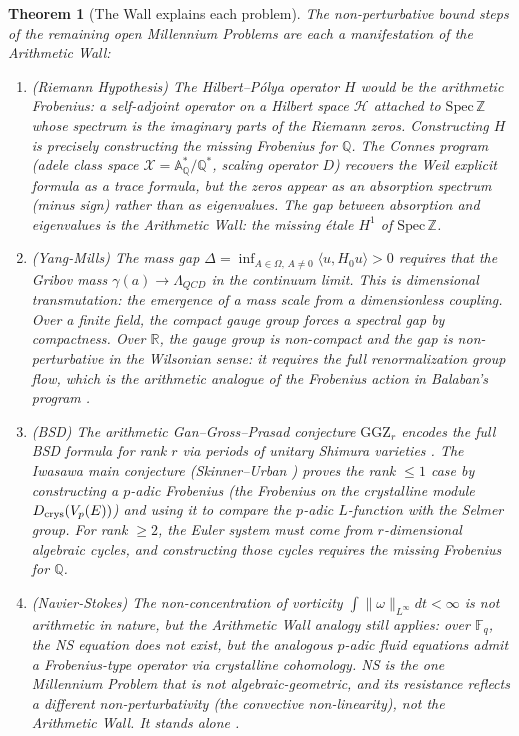 \documentclass[12pt]{article}
\newtheorem{theorem}{Theorem}
\theoremstyle{definition}
\theoremstyle{remark}
\begin{document}
\begin{theorem}[The Wall explains each problem]\label{thm:wall}
The non-perturbative bound steps of the remaining open Millennium Problems
are each a manifestation of the Arithmetic Wall:
\begin{enumerate}
\item \textup{(Riemann Hypothesis)} The Hilbert--Pólya operator $H$ would be
  the arithmetic Frobenius: a self-adjoint operator on a Hilbert space
  $\mathcal{H}$ attached to $\mathrm{Spec}\,\mathbb{Z}$ whose spectrum is the
  imaginary parts of the Riemann zeros. Constructing $H$ is precisely
  constructing the missing Frobenius for $\mathbb{Q}$.
  The Connes program \cite{connes} (adele class space $\mathcal{X} = \mathbb{A}^*_\mathbb{Q}/\mathbb{Q}^*$,
  scaling operator $D$) recovers the Weil explicit formula as a trace
  formula, but the zeros appear as an \emph{absorption spectrum}
  (minus sign) rather than as eigenvalues. The gap between absorption
  and eigenvalues is the Arithmetic Wall: the missing étale $H^1$ of
  $\mathrm{Spec}\,\mathbb{Z}$.

\item \textup{(Yang-Mills)} The mass gap
  $\Delta = \inf_{A\in\Omega,\, A\neq 0}\langle u, H_0 u\rangle > 0$
  requires that the Gribov mass $\gamma(a)\to\Lambda_{QCD}$ in the
  continuum limit. This is dimensional transmutation: the emergence of
  a mass scale from a dimensionless coupling. Over a finite field,
  the compact gauge group forces a spectral gap by compactness.
  Over $\mathbb{R}$, the gauge group is non-compact and the gap is
  non-perturbative in the Wilsonian sense: it requires the full
  renormalization group flow, which is the arithmetic analogue of the
  Frobenius action in Balaban's program \cite{ym2}.

\item \textup{(BSD)} The arithmetic Gan--Gross--Prasad conjecture
  $\mathrm{GGZ}_r$ encodes the full BSD formula for rank $r$
  via periods of unitary Shimura varieties \cite{bsd2}.
  The Iwasawa main conjecture (Skinner--Urban \cite{iwasawa}) proves the
  rank $\leq 1$ case by constructing a $p$-adic Frobenius (the Frobenius
  on the crystalline module $D_{\rm crys}(V_p(E))$) and using it to
  compare the $p$-adic $L$-function with the Selmer group.
  For rank $\geq 2$, the Euler system must come from $r$-dimensional
  algebraic cycles, and constructing those cycles requires the missing
  Frobenius for $\mathbb{Q}$.

\item \textup{(Navier-Stokes)} The non-concentration of vorticity
  $\int\|\omega\|_{L^\infty}dt < \infty$ is not arithmetic in nature,
  but the Arithmetic Wall analogy still applies: over $\mathbb{F}_q$,
  the NS equation does not exist, but the analogous $p$-adic fluid
  equations admit a Frobenius-type operator via crystalline cohomology.
  NS is the one Millennium Problem that is not algebraic-geometric,
  and its resistance reflects a different non-perturbativity
  (the convective non-linearity), not the Arithmetic Wall.
  It stands alone \cite{ns2}.
\end{enumerate}
\end{theorem}
\end{document}

